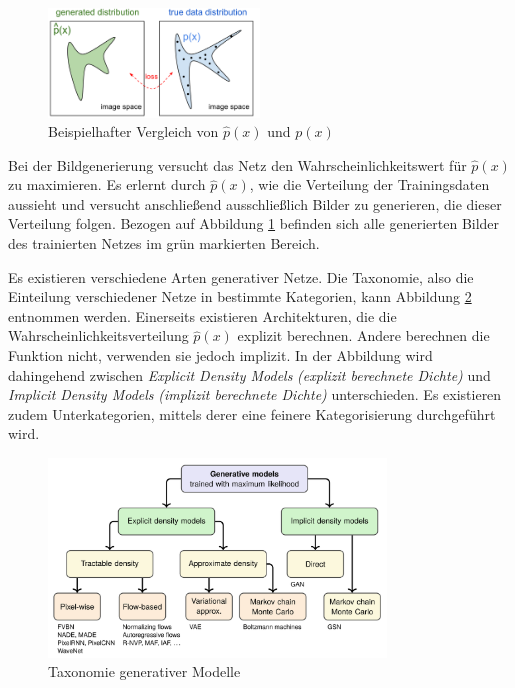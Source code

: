 \begin{figure}[H]
   \centering
   \includegraphics[width=0.5\textwidth]{images/Generative Networks/p(x) Distribution.png}
   \caption{Beispielhafter Vergleich von $\hat{p}(x)$ und $p(x)$ \cite{openAiGenerativeNets}}
   \label{fig:generativeNetsPx}
\end{figure}

Bei der Bildgenerierung versucht das Netz den Wahrscheinlichkeitswert für $\hat{p}(x)$ zu maximieren. Es erlernt durch $\hat{p}(x)$, wie die Verteilung der Trainingsdaten aussieht und versucht anschließend ausschließlich Bilder zu generieren, die dieser Verteilung folgen. Bezogen auf Abbildung \ref{fig:generativeNetsPx} befinden sich alle generierten Bilder des trainierten Netzes im grün markierten Bereich. \cite{generative-modellierung} \cite{openAiGenerativeNets}

Es existieren verschiedene Arten generativer Netze. Die Taxonomie, also die Einteilung verschiedener Netze in bestimmte Kategorien, kann Abbildung \ref{fig:generativeModelsTaxonomy} entnommen werden. Einerseits existieren Architekturen, die die Wahrscheinlichkeitsverteilung $\hat{p}(x)$ explizit berechnen. Andere berechnen die Funktion nicht, verwenden sie jedoch implizit. In der Abbildung wird dahingehend zwischen \emph{Explicit Density Models} \emph{(explizit berechnete Dichte)} und \emph{Implicit Density Models} \emph{(implizit berechnete Dichte)} unterschieden. Es existieren zudem Unterkategorien, mittels derer eine feinere Kategorisierung durchgeführt wird. \cite{generativeModelsBook}

\begin{figure}[H]
   \centering
   \includegraphics[width=0.8\textwidth]{images/Generative Networks/Taxonomy of Generative Models.png}
   \caption{Taxonomie generativer Modelle \cite{generativeModelsBook}}
   \label{fig:generativeModelsTaxonomy}
\end{figure}


